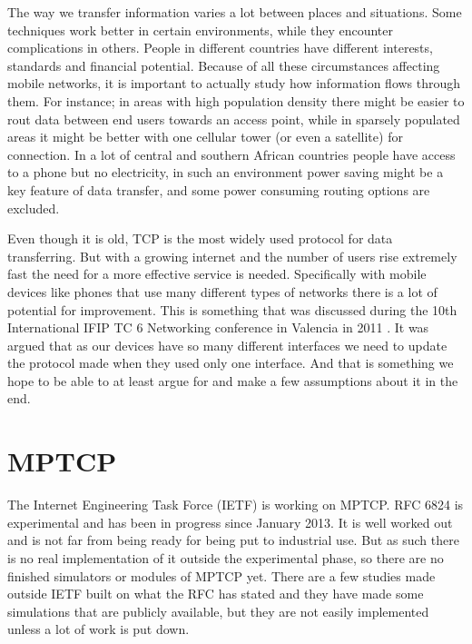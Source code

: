 \documentclass[11pt,twocolumn]{article}
\begin{document}
The way we transfer information varies a lot between places and situations. Some techniques work better in certain environments, while they encounter complications in others. People in different countries have different interests, standards and financial potential. Because of all these circumstances affecting mobile networks, it is important to actually study how information flows through them. For instance; in areas with high population density there might be easier to rout data between end users towards an access point, while in sparsely populated areas it might be better with one cellular tower (or even a satellite) for connection. In a lot of central and southern African countries people have access to a phone but no electricity, in such an environment power saving might be a key feature of data transfer, and some power consuming routing options are excluded.

Even though it is old, TCP is the most widely used protocol for data transferring. But with a growing internet and the number of users rise extremely fast the need for a more effective service is needed. Specifically with mobile devices like phones that use many different types of networks there is a lot of potential for improvement. This is something that was discussed during the 10th International IFIP TC 6 Networking conference in Valencia in 2011 \cite{RFC6824}. It was argued that as our devices have so many different interfaces we need to update the protocol made when they used only one interface. And that is something we hope to be able to at least argue for and make a few assumptions about it in the end.



\section{MPTCP}
The Internet Engineering Task Force (IETF) is working on MPTCP. RFC 6824 is experimental and has been in progress since January 2013. It is well worked out and is not far from being ready for being put to industrial use. But as such there is no real implementation of it outside the experimental phase, so there are no finished simulators or modules of MPTCP yet. There are a few studies made outside IETF built on what the RFC has stated and they have made some simulations that are publicly available, but they are not easily implemented unless a lot of work is put down.
\end{document}
